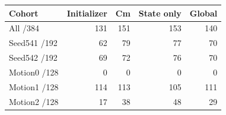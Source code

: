 \begin{tabular}{lrrrr}
\toprule
Cohort & Initializer & Cm & State only & Global\\
\midrule
All /384 & 131 & 151 & 153 & 140\\
Seed541 /192 & 62 & 79 & 77 & 70\\
Seed542 /192 & 69 & 72 & 76 & 70\\
Motion0 /128 & 0 & 0 & 0 & 0\\
Motion1 /128 & 114 & 113 & 105 & 111\\
Motion2 /128 & 17 & 38 & 48 & 29\\
\bottomrule
\end{tabular}
